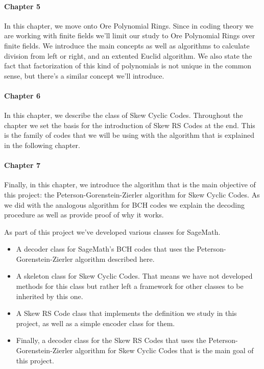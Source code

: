\paragraph{Chapter 5} In this chapter, we move onto Ore Polynomial Rings.
Since in coding theory we are working with finite fields we'll limit our study to Ore Polynomial Rings over finite fields.
We introduce the main concepts as well as algorithms to calculate division from left or right, and an extented Euclid algorithm.
We also state the fact that factorization of this kind of polynomials is not unique in the common sense, but there's a similar concept we'll introduce.

\paragraph{Chapter 6} In this chapter, we describe the class of Skew Cyclic Codes.
Throughout the chapter we set the basis for the introduction of Skew RS Codes at the end.
This is the family of codes that we will be using with the algorithm that is explained in the following chapter.

\paragraph{Chapter 7} Finally, in this chapter, we introduce the algorithm that is the main objective of this project: the Peterson-Gorenstein-Zierler algorithm for Skew Cyclic Codes.
As we did with the analogous algorithm for BCH codes we explain the decoding procedure as well as provide proof of why it works.

As part of this project we've developed various classes for SageMath.
\begin{itemize}
  \item A decoder class for SageMath's BCH codes that uses the Peterson-Gorenstein-Zierler algorithm described here.
  \item A skeleton class for Skew Cyclic Codes. That means we have not developed methods for this class but rather left a framework for other classes to be inherited by this one.
  \item A Skew RS Code class that implements the definition we study in this project, as well as a simple encoder class for them.
  \item Finally, a decoder class for the Skew RS Codes that uses the Peterson-Gorenstein-Zierler algorithm for Skew Cyclic Codes that is the main goal of this project.
\end{itemize}

